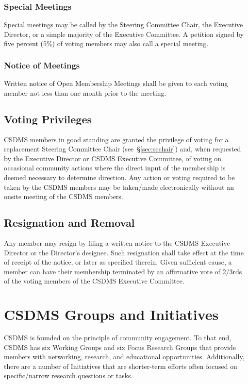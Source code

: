 \documentclass[11pt, oneside]{article}   	%
\def\article#1{
\renewcommand{\thesection}{Article \Roman{section}} 
\section[Article]{#1}
\renewcommand{\thesection}{\Roman{section}} 
}
\begin{document}
\subsubsection{Special Meetings} 

Special meetings may be called by the Steering Committee Chair, the Executive Director, or a simple majority of the Executive Committee. A petition signed by five percent (5\%) of voting members may also call a special meeting.

\subsubsection{Notice of Meetings} 

Written notice of Open Membership Meetings shall be given to each voting member not less than one month prior to the meeting.


\subsection{Voting Privileges}

CSDMS members in good standing are granted the privilege of voting for a replacement Steering Committee Chair (see~\S\ref{sec:scchair}) and, when requested by the Executive Director or CSDMS Executive Committee, of voting on occasional community actions where the direct input of the membership is deemed necessary to determine direction.  Any action or voting required to be taken by the CSDMS members may be taken/made electronically without an onsite meeting of the CSDMS members.


\subsection{Resignation and Removal}

Any member may resign by filing a written notice to the CSDMS Executive Director or the Director's designee.  Such resignation shall take effect at the time of receipt of the notice, or later as specified therein. Given sufficient cause, a member can have their membership terminated by an affirmative vote of 2/3rds of the voting members of the CSDMS Executive Committee.



\article{CSDMS Groups and Initiatives}

CSDMS is founded on the principle of community engagement. To that end, CSDMS has six Working Groups and six Focus Research Groups that provide members with networking, research, and educational opportunities.  Additionally, there are a number of Initiatives that are shorter-term efforts often focused on specific/narrow research questions or tasks. 
\end{document}
